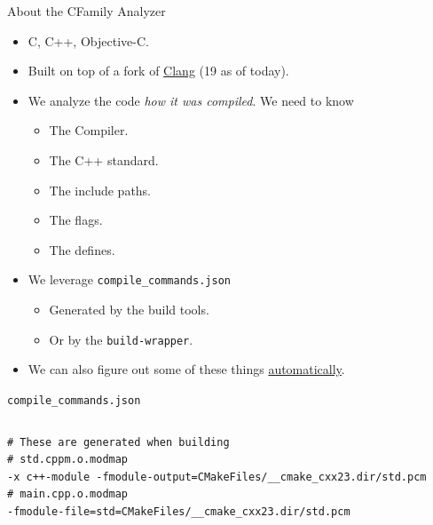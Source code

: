 \documentclass[]{beamer}
\begin{document}
\begin{frame}[t]{About the CFamily Analyzer}
  \begin{block}{}
    \begin{itemize}
      \item C, C++, Objective-C.
      \item Built on top of a fork of \href{https://clang.llvm.org/}{Clang} (19 as of today).
      \item We analyze the code \emph{how it was compiled}. We need to know
            \begin{itemize}
              \item The Compiler.
              \item The C++ standard.
              \item The include paths.
              \item The flags.
              \item The defines.
            \end{itemize}
      \item We leverage \texttt{compile\_commands.json}
            \begin{itemize}
              \item Generated by the build tools.
              \item Or by the \texttt{build-wrapper}.
            \end{itemize}
      \item We can also figure out some of these things \href{https://docs.sonarsource.com/sonarqube-cloud/advanced-setup/automatic-analysis}{automatically}. 
    \end{itemize}
  \end{block}
\end{frame}

\begin{frame}[containsverbatim]{\texttt{compile\_commands.json}}
  \inputminted[breaklines]{json}{snippets/compdb/compile_commands.json}
  \begin{verbatim}
# These are generated when building
# std.cppm.o.modmap
-x c++-module -fmodule-output=CMakeFiles/__cmake_cxx23.dir/std.pcm
# main.cpp.o.modmap
-fmodule-file=std=CMakeFiles/__cmake_cxx23.dir/std.pcm
  \end{verbatim}
\end{frame}
\end{document}
